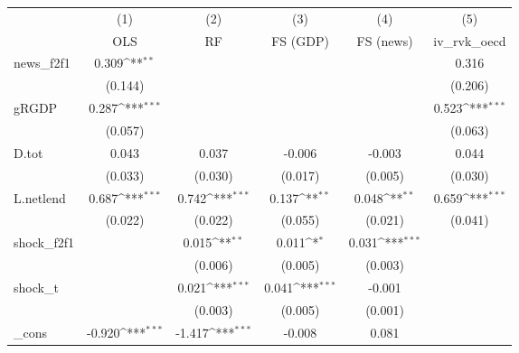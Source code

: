 {
\def\sym#1{\ifmmode^{#1}\else\(^{#1}\)\fi}
\begin{tabular}{l*{5}{c}}
\toprule
            &\multicolumn{1}{c}{(1)}&\multicolumn{1}{c}{(2)}&\multicolumn{1}{c}{(3)}&\multicolumn{1}{c}{(4)}&\multicolumn{1}{c}{(5)}\\
            &\multicolumn{1}{c}{OLS}&\multicolumn{1}{c}{RF}&\multicolumn{1}{c}{FS (GDP)}&\multicolumn{1}{c}{FS (news)}&\multicolumn{1}{c}{iv\_rvk\_oecd}\\
\midrule
news\_f2f1   &       0.309\sym{**} &                     &                     &                     &       0.316         \\
            &     (0.144)         &                     &                     &                     &     (0.206)         \\
\addlinespace
gRGDP       &       0.287\sym{***}&                     &                     &                     &       0.523\sym{***}\\
            &     (0.057)         &                     &                     &                     &     (0.063)         \\
\addlinespace
D.tot       &       0.043         &       0.037         &      -0.006         &      -0.003         &       0.044         \\
            &     (0.033)         &     (0.030)         &     (0.017)         &     (0.005)         &     (0.030)         \\
\addlinespace
L.netlend   &       0.687\sym{***}&       0.742\sym{***}&       0.137\sym{**} &       0.048\sym{**} &       0.659\sym{***}\\
            &     (0.022)         &     (0.022)         &     (0.055)         &     (0.021)         &     (0.041)         \\
\addlinespace
shock\_f2f1  &                     &       0.015\sym{**} &       0.011\sym{*}  &       0.031\sym{***}&                     \\
            &                     &     (0.006)         &     (0.005)         &     (0.003)         &                     \\
\addlinespace
shock\_t     &                     &       0.021\sym{***}&       0.041\sym{***}&      -0.001         &                     \\
            &                     &     (0.003)         &     (0.005)         &     (0.001)         &                     \\
\addlinespace
\_cons      &      -0.920\sym{***}&      -1.417\sym{***}&      -0.008         &       0.081         &                     \\

\end{tabular}}
